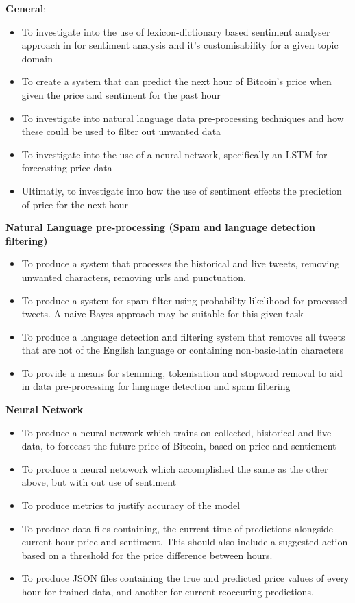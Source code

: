 \documentclass[oneside, 10pt]{article}
\begin{document}
		\textbf{General}:
		\begin{itemize}
			\item To investigate into the use of lexicon-dictionary based sentiment analyser approach in for sentiment analysis and it's customisability for a given topic domain
			\item To create a system that can predict the next hour of Bitcoin’s price when given the price and sentiment for the past hour
			\item To investigate into natural language data pre-processing techniques and how these could be used to filter out unwanted data
			\item To investigate into the use of a neural network, specifically an LSTM for forecasting price data
			\item Ultimatly, to investigate into how the use of sentiment effects the prediction of price for the next hour
			\newline
		\end{itemize}
		
	
		\textbf{Natural Language pre-processing (Spam and language detection filtering)}
		\begin{itemize}
			\item To produce a system that processes the historical and live tweets, removing unwanted characters, removing urls and punctuation.
			\item To produce a system for spam filter using probability likelihood for processed tweets. A naive Bayes approach may be suitable for this given task
			\item To produce a language detection and filtering system that removes all tweets that are not of the English language or containing non-basic-latin characters
			\item To provide a means for stemming, tokenisation and stopword removal to aid in data pre-processing for language detection and spam filtering
			\newline
		\end{itemize}
		
		\textbf{Neural Network}
		\begin{itemize}
			\item To produce a neural network which trains on collected, historical and live data, to forecast the future price of Bitcoin, based on price and sentiement
			\item To produce a neural netowork which accomplished the same as the other above, but with out use of sentiment
			\item To produce metrics to justify accuracy of the model
			\item To produce data files containing, the current time of predictions alongside current hour price and sentiment. This should also include a suggested action based on a threshold for the price difference between hours. 
			\item To produce JSON files containing the true and predicted price values of every hour for trained data, and another for current reoccuring predictions.
			\newline
		\end{itemize}
		
\end{document}
